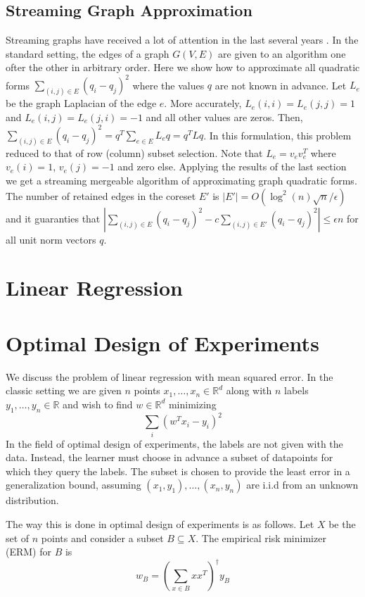 \documentclass[anon,12pt]{colt2019} %
\newcommand{\ip}[1]{\left \langle #1 \right \rangle}
\newcommand{\R}{\mathbb{R}}
\newcommand{\eps}{\epsilon}
\begin{document}
\subsection{Streaming Graph Approximation}
Streaming graphs have received a lot of attention in the last several years \cite{}. 
In the standard setting, the edges of a graph $G(V,E)$ are given to an algorithm one ofter the other in arbitrary order.
Here we show how to approximate all quadratic forms $\sum_{(i,j) \in E} (q_i - q_j)^2$ where the values $q$ are not known in advance.
Let $L_e$ be the graph Laplacian of the edge $e$. More accurately, $L_e(i,i) = L_e(j,j) = 1$ and  $L_e(i,j) = L_e(j,i) = -1$ and all other values are zeros.
Then, $\sum_{(i,j) \in E} (q_i - q_j)^2 = q^T \sum_{e \in E}L_e q = q^T L q$. 
In this formulation, this problem reduced to that of row (column) subset selection. 
Note that $L_e = v_ev_e^T$ where $v_e(i) = 1$, $v_e(j)=-1$ and zero else.
Applying the results of the last section we get a streaming mergeable algorithm of approximating graph quadratic forms.
The number of retained edges in the coreset $E'$ is $|E'| = O(\log^{2}(n) \sqrt{n}/\eps)$ and it guaranties that 
$|\sum_{(i,j) \in E} (q_i - q_j)^2  - c \sum_{(i,j) \in E'} (q_i - q_j)^2| \le \eps n$ for all unit norm vectors $q$.



\section{Linear Regression}

\section{Optimal Design of Experiments}
We discuss the problem of linear regression with mean squared error. In the classic setting we are given $n$ points $x_1,\ldots,x_n \in \R^d$ along with $n$ labels $y_1,\ldots,y_n \in \R$ and wish to find $w \in \R^d$ minimizing
$$ \sum_i (w^Tx_i - y_i)^2 $$
In the field of optimal design of experiments, the labels are not given with the data. Instead, the learner must choose in advance a subset of datapoints for which they query the labels. The subset is chosen to provide the least error in a generalization bound, assuming $(x_1,y_1),\ldots,(x_n,y_n)$ are i.i.d from an unknown distribution.

The way this is done in optimal design of experiments is as follows. Let $X$ be the set of $n$ points and consider a subset $B \subseteq X$. The empirical risk minimizer (ERM) for $B$ is 
$$ w_B = \left( \sum_{x \in B} xx^T \right)^{\dagger} y_B $$
\end{document}
